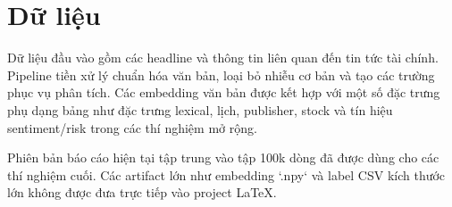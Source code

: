 \section{Dữ liệu}

Dữ liệu đầu vào gồm các headline và thông tin liên quan đến tin tức tài chính. Pipeline tiền xử lý chuẩn hóa văn bản, loại bỏ nhiễu cơ bản và tạo các trường phục vụ phân tích. Các embedding văn bản được kết hợp với một số đặc trưng phụ dạng bảng như đặc trưng lexical, lịch, publisher, stock và tín hiệu sentiment/risk trong các thí nghiệm mở rộng.

Phiên bản báo cáo hiện tại tập trung vào tập 100k dòng đã được dùng cho các thí nghiệm cuối. Các artifact lớn như embedding `.npy` và label CSV kích thước lớn không được đưa trực tiếp vào project LaTeX.
